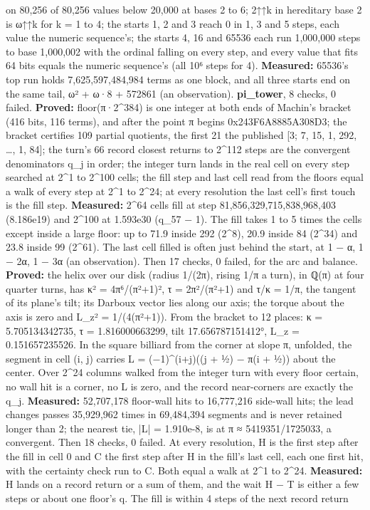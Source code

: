 \begin{description}
on 80,256 of 80,256 values below 20,000 at bases 2 to 6; 2↑↑k in hereditary base 2 is ω↑↑k for k = 1 to 4; the starts 1, 2 and 3 reach 0 in 1, 3 and 5 steps, each value the numeric sequence's; the starts 4, 16 and 65536 each run 1,000,000 steps to base 1,000,002 with the ordinal falling on every step, and every value that fits 64 bits equals the numeric sequence's (all 10⁶ steps for 4). \textbf{Measured:} 65536's top run holds 7,625,597,484,984 terms as one block, and all three starts end on the same tail, ω² + ω·8 + 572861 (an observation). \textbf{pi\_\allowbreak{}tower}, 8 checks, 0 failed. \textbf{Proved:} floor(π·2\textasciicircum{}384) is one integer at both ends of Machin's bracket (416 bits, 116 terms), and after the point π begins 0x243F6A8885A308D3; the bracket certifies 109 partial quotients, the first 21 the published [3; 7, 15, 1, 292, …, 1, 84]; the turn's 66 record closest returns to 2\textasciicircum{}112 steps are the convergent denominators q\_\allowbreak{}j in order; the integer turn lands in the real cell on every step searched at 2\textasciicircum{}1 to 2\textasciicircum{}100 cells; the fill step and last cell read from the floors equal a walk of every step at 2\textasciicircum{}1 to 2\textasciicircum{}24; at every resolution the last cell's first touch is the fill step. \textbf{Measured:} 2\textasciicircum{}64 cells fill at step 81,856,329,715,838,968,403 (8.186e19) and 2\textasciicircum{}100 at 1.593e30 (q\_\allowbreak{}57 − 1). The fill takes 1 to 5 times the cells except inside a large floor: up to 71.9 inside 292 (2\textasciicircum{}8), 20.9 inside 84 (2\textasciicircum{}34) and 23.8 inside 99 (2\textasciicircum{}61). The last cell filled is often just behind the start, at 1 − α, 1 − 2α, 1 − 3α (an observation). Then 17 checks, 0 failed, for the arc and balance. \textbf{Proved:} the helix over our disk (radius 1/(2π), rising 1/π a turn), in ℚ(π) at four quarter turns, has κ² = 4π⁶/(π²+1)², τ = 2π²/(π²+1) and τ/κ = 1/π, the tangent of its plane's tilt; its Darboux vector lies along our axis; the torque about the axis is zero and L\_\allowbreak{}z² = 1/(4(π²+1)). From the bracket to 12 places: κ = 5.705134342735, τ = 1.816000663299, tilt 17.656787151412°, L\_\allowbreak{}z = 0.151657235526. In the square billiard from the corner at slope π, unfolded, the segment in cell (i, j) carries L = (−1)\textasciicircum{}(i+j)((j + ½) − π(i + ½)) about the center. Over 2\textasciicircum{}24 columns walked from the integer turn with every floor certain, no wall hit is a corner, no L is zero, and the record near-corners are exactly the q\_\allowbreak{}j. \textbf{Measured:} 52,707,178 floor-wall hits to 16,777,216 side-wall hits; the lead changes passes 35,929,962 times in 69,484,394 segments and is never retained longer than 2; the nearest tie, |L| = 1.910e-8, is at π ≈ 5419351/1725033, a convergent. Then 18 checks, 0 failed. At every resolution, H is the first step after the fill in cell 0 and C the first step after H in the fill's last cell, each one first hit, with the certainty check run to C. Both equal a walk at 2\textasciicircum{}1 to 2\textasciicircum{}24. \textbf{Measured:} H lands on a record return or a sum of them, and the wait H − T is either a few steps or about one floor's q. The fill is within 4 steps of the next record return 
\end{description}
